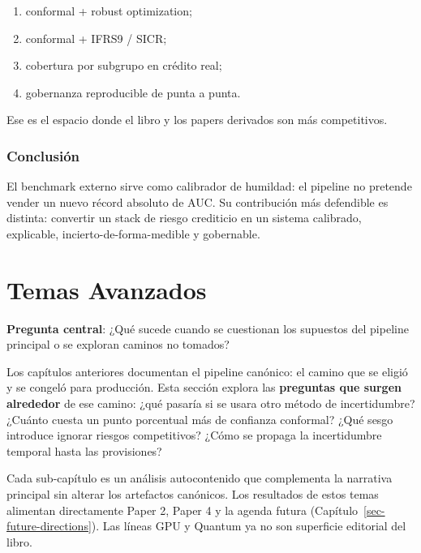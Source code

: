 \documentclass[
  spanish,
  11pt,
  letterpaper,
]{scrbook}
\providecommand{\tightlist}{%
  \setlength{\itemsep}{0pt}\setlength{\parskip}{0pt}}
\theoremstyle{plain}
\theoremstyle{remark}
\begin{document}
\begin{enumerate}
\def\labelenumi{\arabic{enumi}.}
\tightlist
\item
  conformal + robust optimization;
\item
  conformal + IFRS9 / SICR;
\item
  cobertura por subgrupo en crédito real;
\item
  gobernanza reproducible de punta a punta.
\end{enumerate}

Ese es el espacio donde el libro y los papers derivados son más
competitivos.

\subsection{Conclusión}\label{conclusiuxf3n}

El benchmark externo sirve como calibrador de humildad: el pipeline no
pretende vender un nuevo récord absoluto de AUC. Su contribución más
defendible es distinta: convertir un stack de riesgo crediticio en un
sistema calibrado, explicable, incierto-de-forma-medible y gobernable.

\chapter{Temas Avanzados}\label{temas-avanzados}

\textbf{Pregunta central}: ¿Qué sucede cuando se cuestionan los
supuestos del pipeline principal o se exploran caminos no tomados?

Los capítulos anteriores documentan el pipeline canónico: el camino que
se eligió y se congeló para producción. Esta sección explora las
\textbf{preguntas que surgen alrededor} de ese camino: ¿qué pasaría si
se usara otro método de incertidumbre? ¿Cuánto cuesta un punto
porcentual más de confianza conformal? ¿Qué sesgo introduce ignorar
riesgos competitivos? ¿Cómo se propaga la incertidumbre temporal hasta
las provisiones?

Cada sub-capítulo es un análisis autocontenido que complementa la
narrativa principal sin alterar los artefactos canónicos. Los resultados
de estos temas alimentan directamente Paper 2, Paper 4 y la agenda
futura (Capítulo~\ref{sec-future-directions}). Las líneas GPU y Quantum
ya no son superficie editorial del libro.
\end{document}
